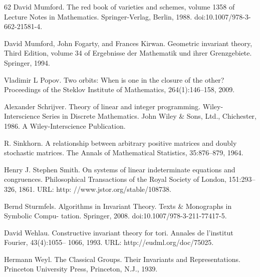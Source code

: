 \documentclass[10pt,a4paper]{article}
\theoremstyle{definition}
\numberwithin{equation}{section}
\begin{document}
\begin{thebibliography}{62}
David Mumford. The red book of varieties and schemes, volume 1358 of Lecture Notes in Mathematics. Springer-Verlag, Berlin, 1988. doi:10.1007/978-3-662-21581-4.

David Mumford, John Fogarty, and Frances Kirwan. Geometric invariant theory, Third Edition, volume 34 of Ergebnisse der Mathematik und ihrer Grenzgebiete. Springer, 1994.

Vladimir L Popov. Two orbits: When is one in the closure of the other? Proceedings of the Steklov Institute of Mathematics, 264(1):146–158, 2009.

Alexander Schrijver. Theory of linear and integer programming. Wiley-Interscience Series in Discrete Mathematics. John Wiley \& Sons, Ltd., Chichester, 1986. A Wiley-Interscience Publication.

R. Sinkhorn. A relationship between arbitrary positive matrices and doubly stochastic matrices. The Annals of Mathematical Statistics, 35:876–879, 1964.

Henry J. Stephen Smith. On systems of linear indeterminate equations and congruences. Philosophical Transactions of the Royal Society of London, 151:293–326, 1861. URL: http: //www.jstor.org/stable/108738.

Bernd Sturmfels. Algorithms in Invariant Theory. Texts \& Monographs in Symbolic Compu- tation. Springer, 2008. doi:10.1007/978-3-211-77417-5.

David Wehlau. Constructive invariant theory for tori. Annales de l’institut Fourier, 43(4):1055– 1066, 1993. URL: http://eudml.org/doc/75025.

Hermann Weyl. The Classical Groups. Their Invariants and Representations. Princeton University Press, Princeton, N.J., 1939.
\end{thebibliography}
\end{document}
